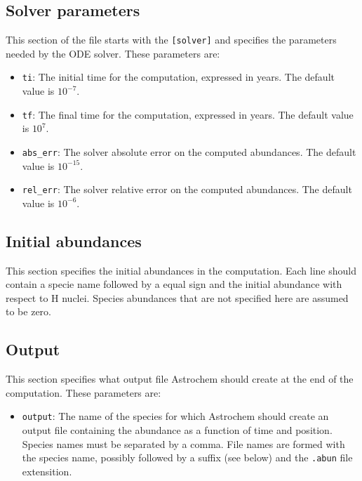 \documentclass[a4paper,12pt]{article}
\begin{document}
{\begin{itemize}
\end{itemize}

\subsection{Solver parameters}
\label{sec:solver-parameters}

This section of the file starts with the \verb=[solver]= and specifies
the parameters needed by the ODE solver. These parameters are:

\begin{itemize}

\item \verb=ti=: The initial time for the computation, expressed in
  years. The default value is $10^{-7}$.

\item \verb=tf=: The final time for the computation, expressed in
  years. The default value is $10^{7}$.

\item \verb=abs_err=: The solver absolute error on the computed
  abundances. The default value is $10^{-15}$.

\item \verb=rel_err=: The solver relative error on the computed
  abundances. The default value is $10^{-6}$.

\end{itemize}

\subsection{Initial abundances}
\label{sec:initial-abundances}

This section specifies the initial abundances in the computation. Each
line should contain a specie name followed by a equal sign and the
initial abundance with respect to H nuclei. Species abundances that
are not specified here are assumed to be zero.

\subsection{Output}
\label{sec:output}

This section specifies what output file Astrochem should create at the
end of the computation. These parameters are:

\begin{itemize}

\item \verb=output=: The name of the species for which Astrochem
  should create an output file containing the abundance as a function
  of time and position. Species names must be separated by a
  comma. File names are formed with the species name, possibly
  followed by a suffix (see below) and the \verb=.abun= file
  extensition.


\end{itemize}}
\end{document}
